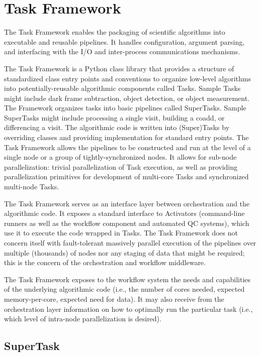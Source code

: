 \documentclass[DM,lsstdraft,toc]{lsstdoc}
\begin{document}
\section{Task Framework}\label{task-framework}

The Task Framework enables the packaging of scientific algorithms into
executable and reusable pipelines. It handles configuration, argument parsing,
and interfacing with the I/O and inter-process communications mechanisms.

The Task Framework is a Python class library that provides a structure of
standardized class entry points and conventions to organize low-level
algorithms into potentially-reusable algorithmic components called Tasks.
Sample Tasks might include dark frame subtraction, object detection, or object
measurement.  The Framework organizes tasks into basic pipelines called
SuperTasks.  Sample SuperTasks might include processing a single visit,
building a coadd, or differencing a visit. The algorithmic code is written into
(Super)Tasks by overriding classes and providing implementation for standard
entry points. The Task Framework allows the pipelines to be constructed and run
at the level of a single node or a group of tightly-synchronized nodes. It
allows for sub-node parallelization: trivial parallelization of Task execution,
as well as providing parallelization primitives for development of multi-core
Tasks and synchronized multi-node Tasks.

The Task Framework serves as an interface layer between orchestration
and the algorithmic code. It exposes a standard interface to Activators
(command-line runners as well as the workflow component and automated QC
systems), which use it to execute the code wrapped in Tasks. The Task Framework
does not concern itself with fault-tolerant massively parallel execution of the
pipelines over multiple (thousands) of nodes nor any staging of data that might
be required; this is the concern of the orchestration and workflow middleware.

The Task Framework exposes to the workflow system the needs and capabilities
of the underlying algorithmic code (i.e., the number of cores needed, expected
memory-per-core, expected need for data). It may also receive from the
orchestration layer information on how to optimally run the particular task
(i.e., which level of intra-node parallelization is desired).

\subsection{SuperTask}\label{supertask}
\end{document}
